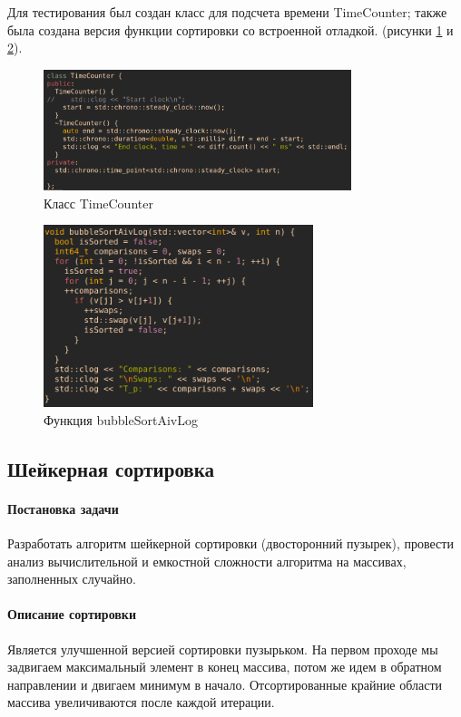 \documentclass[a4paper, 14pt]{extarticle}
\begin{document}
\newpage
Для тестирования был создан класс для подсчета времени TimeCounter;
также была создана версия функции сортировки со встроенной отладкой.
(рисунки \ref{fig:time_counter_code} и \ref{fig:first_sort_log}).
\begin{figure}[htpb]
  \centering
  \includegraphics[width=0.8\textwidth]{pictures/time_counter_code.png}
  \caption{Класс TimeCounter}
  \label{fig:time_counter_code}
\end{figure}
\begin{figure}[htpb]
  \centering
  \includegraphics[width=0.7\textwidth]{pictures/first_sort_log.png}
  \caption{Функция bubbleSortAivLog}
  \label{fig:first_sort_log}
\end{figure}
\newpage
\subsection{Шейкерная сортировка}
\paragraph{Постановка задачи}
Разработать алгоритм шейкерной сортировки (двосторонний пузырек),
провести анализ вычислительной и емкостной сложности алгоритма
на массивах, заполненных случайно.
\paragraph{Описание сортировки}
Является улучшенной версией сортировки пузырьком. На первом проходе мы задвигаем
максимальный элемент в конец массива, потом же идем в обратном направлении
и двигаем минимум в начало. Отсортированные крайние области массива увеличиваются
после каждой итерации.
\newpage
\end{document}
